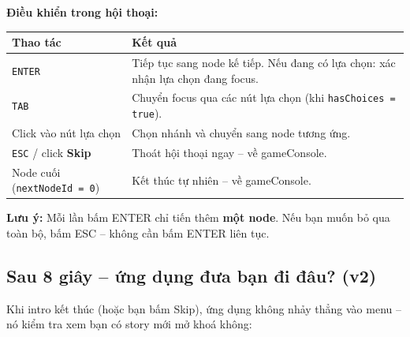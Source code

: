 \documentclass[12pt,a4paper]{article}
\renewcommand{\notebox}[1]{%
  \vspace{4pt}%
  \noindent\colorbox{cyan!12}{\begin{minipage}{0.96\linewidth}%
    \vspace{2pt}\textbf{Lưu ý:} #1\vspace{2pt}%
  \end{minipage}}%
  \vspace{4pt}%
}
\begin{document}
\noindent\textbf{Điều khiển trong hội thoại:}

\vspace{4pt}
\begin{tabularx}{\linewidth}{|l|X|}
    \hline
    \textbf{Thao tác}                      & \textbf{Kết quả} \\
    \hline
    \texttt{ENTER}                         & Tiếp tục sang node kế tiếp.
                                             Nếu đang có lựa chọn: xác nhận lựa chọn đang focus. \\
    \hline
    \texttt{TAB}                           & Chuyển focus qua các nút lựa chọn
                                             (khi \texttt{hasChoices = true}). \\
    \hline
    Click vào nút lựa chọn                 & Chọn nhánh và chuyển sang node tương ứng. \\
    \hline
    \texttt{ESC} / click \textbf{Skip}     & Thoát hội thoại ngay -- về gameConsole. \\
    \hline
    Node cuối (\texttt{nextNodeId = 0})    & Kết thúc tự nhiên -- về gameConsole. \\
    \hline
\end{tabularx}

\notebox{Mỗi lần bấm ENTER chỉ tiến thêm \textbf{một node}. Nếu bạn muốn
bỏ qua toàn bộ, bấm ESC -- không cần bấm ENTER liên tục.}

\subsection{Sau 8 giây -- ứng dụng đưa bạn đi đâu? (v2)}

Khi intro kết thúc (hoặc bạn bấm Skip), ứng dụng không nhảy thẳng vào
menu -- nó kiểm tra xem bạn có story mới mở khoá không:
\end{document}
